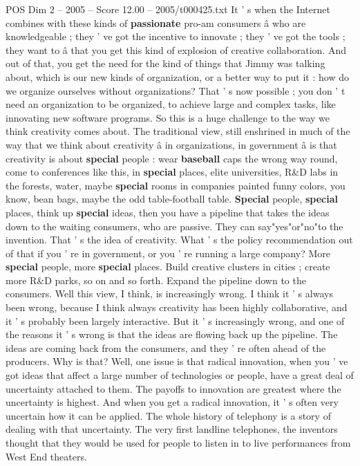 \begin{textsample}{POS Dim 2 – 2005 – Score 12.00 – 2005/t000425.txt}
It ' s when the Internet combines with these kinds of \textbf{passionate} pro-am consumers â who are knowledgeable ; they ' ve got the incentive to innovate ; they ' ve got the tools ; they want to â that you get this kind of explosion of creative collaboration.
And out of that, you get the need for the kind of things that Jimmy was talking about, which is our new kinds of organization, or a better way to put it : how do we organize ourselves without organizations?
That ' s now possible ; you don ' t need an organization to be organized, to achieve large and complex tasks, like innovating new software programs.
So this is a huge challenge to the way we think creativity comes about.
The traditional view, still enshrined in much of the way that we think about creativity â in organizations, in government â is that creativity is about \textbf{special} people : wear \textbf{baseball} caps the wrong way round, come to conferences like this, in \textbf{special} places, elite universities, R\&D labs in the forests, water, maybe \textbf{special} rooms in companies painted funny colors, you know, bean bags, maybe the odd table-football table. \textbf{Special} people, \textbf{special} places, think up \textbf{special} ideas, then you have a pipeline that takes the ideas down to the waiting consumers, who are passive.
They can say"yes"or"no"to the invention.
That ' s the idea of creativity.
What ' s the policy recommendation out of that if you ' re in government, or you ' re running a large company?
More \textbf{special} people, more \textbf{special} places.
Build creative clusters in cities ; create more R\&D parks, so on and so forth.
Expand the pipeline down to the consumers.
Well this view, I think, is increasingly wrong.
I think it ' s always been wrong, because I think always creativity has been highly collaborative, and it ' s probably been largely interactive.
But it ' s increasingly wrong, and one of the reasons it ' s wrong is that the ideas are flowing back up the pipeline.
The ideas are coming back from the consumers, and they ' re often ahead of the producers.
Why is that?
Well, one issue is that radical innovation, when you ' ve got ideas that affect a large number of technologies or people, have a great deal of uncertainty attached to them.
The payoffs to innovation are greatest where the uncertainty is highest.
And when you get a radical innovation, it ' s often very uncertain how it can be applied.
The whole history of telephony is a story of dealing with that uncertainty.
The very first landline telephones, the inventors thought that they would be used for people to listen in to live performances from West End theaters.

\end{textsample}
